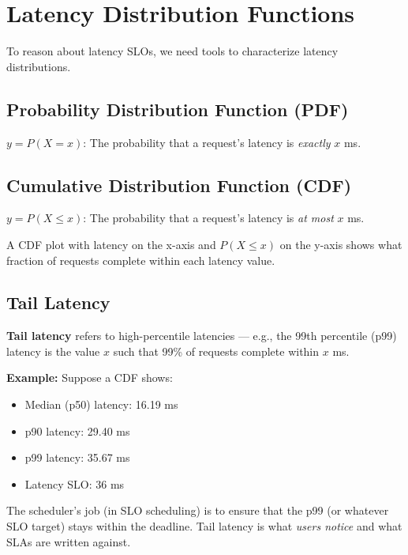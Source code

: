 \documentclass[11pt]{article}
\begin{document}
\section{Latency Distribution Functions}

To reason about latency SLOs, we need tools to characterize latency distributions.

\subsection{Probability Distribution Function (PDF)}

$y = P(X = x)$: The probability that a request's latency is \emph{exactly} $x$ ms.

\subsection{Cumulative Distribution Function (CDF)}

$y = P(X \leq x)$: The probability that a request's latency is \emph{at most} $x$ ms.

A CDF plot with latency on the x-axis and $P(X \leq x)$ on the y-axis shows what fraction of requests complete within each latency value.

\subsection{Tail Latency}

\textbf{Tail latency} refers to high-percentile latencies --- e.g., the 99th percentile (p99) latency is the value $x$ such that 99\% of requests complete within $x$ ms.

\textbf{Example:} Suppose a CDF shows:
\begin{itemize}
    \item Median (p50) latency: 16.19 ms
    \item p90 latency: 29.40 ms
    \item p99 latency: 35.67 ms
    \item Latency SLO: 36 ms
\end{itemize}

The scheduler's job (in SLO scheduling) is to ensure that the p99 (or whatever SLO target) stays within the deadline. Tail latency is what \emph{users notice} and what SLAs are written against.

\end{document}
